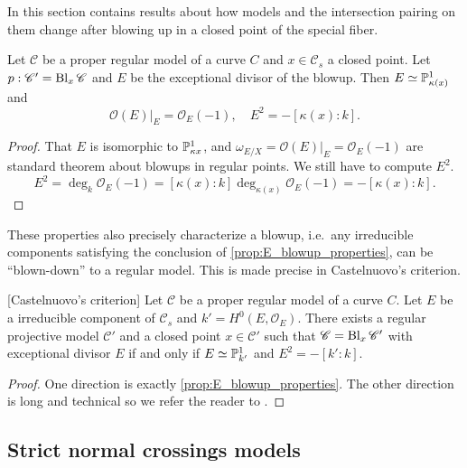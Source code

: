 In this section contains results about how models and the intersection pairing on them change after blowing up in a closed point of the special fiber.  

\begin{proposition}\label{prop:E_blowup_properties}
	Let $\mathscr C$ be a proper regular model of a curve $C$ and $x \in \mathscr C_s$ a closed point. 
	Let $p: \mathscr C' = \operatorname{Bl}_x \mathscr C$ and $E$ be the exceptional divisor of the blowup. 
	Then $E \simeq \mathbb{P}^{1}_{\kappa(x)}$ and \[
		\mathcal{O}(E)|_E = \mathcal{O}_E(-1), \quad E^2 = -[\kappa (x): k]
	.\] 
\end{proposition}
\begin{proof}
	That $E$ is isomorphic to $\mathbb{P}^{1}_{\kappa x}$, and $\omega_{E / X} = \mathcal{O}(E)|_E = \mathcal{O}_E(-1)$ are standard theorem about blowups in regular points. 
	We still have to compute $E^2$. 
	\[
		E^2 = \deg_k \mathcal{O}_E(-1) = [\kappa(x): k] \deg_{\kappa (x)} \mathcal{O}_E(-1) = -[\kappa(x): k]
	.\] 
\end{proof}

These properties also precisely characterize a blowup, i.e.\ any irreducible components satisfying the conclusion of \cref{prop:E_blowup_properties}, can be ``blown-down'' to a regular model.
This is made precise in Castelnuovo's criterion. 

\begin{theorem}\label{thm:castelnuovo}
	[Castelnuovo's criterion]
	Let $\mathscr C$ be a proper regular model of a curve $C$.
	Let $E$ be a irreducible component of $\mathscr C_s$ and $k' = H^{0}(E, \mathcal{O}_E)$. 
	There exists a regular projective model $\mathscr C'$ and a closed point $x \in \mathscr C'$ such that $\mathscr C = \operatorname{Bl}_x \mathscr C'$ with exceptional divisor $E$ if and only if $E \simeq \mathbb{P}_{k'}^{1}$ and $E^2 = -[k': k]$. 
\end{theorem}
\begin{proof}
	One direction is exactly \cref{prop:E_blowup_properties}. 
	The other direction is long and technical so we refer the reader to \cite[sec.\ 9.3.1]{liuAlgebraicGeometryArithmetic2002}.
\end{proof}

\subsection{Strict normal crossings models} \label{sec:strict_normal_crossings_models}

